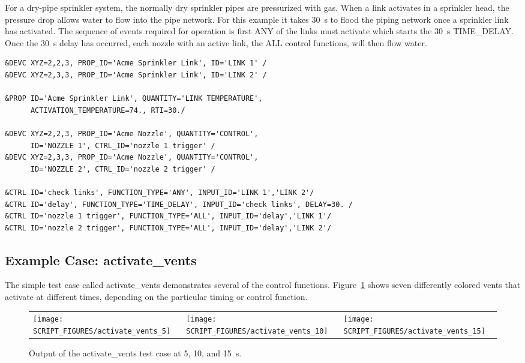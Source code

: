 \documentclass[11pt]{book}
\begin{document}
For a dry-pipe sprinkler system, the normally
dry sprinkler pipes are pressurized with gas.  When a link activates in a sprinkler head, the pressure drop allows
water to flow into the pipe network.  For this example it takes 30~s to flood the piping network once a sprinkler link
has activated.  The sequence of events required for operation is first {\ct ANY} of the links must activate which
starts the 30~s {\ct TIME\_DELAY}.  Once the 30~s delay has occurred, each nozzle with an active link, the {\ct ALL}
control functions, will then flow water.

\begin{lstlisting}
&DEVC XYZ=2,2,3, PROP_ID='Acme Sprinkler Link', ID='LINK 1' /
&DEVC XYZ=2,3,3, PROP_ID='Acme Sprinkler Link', ID='LINK 2' /

&PROP ID='Acme Sprinkler Link', QUANTITY='LINK TEMPERATURE',
      ACTIVATION_TEMPERATURE=74., RTI=30./

&DEVC XYZ=2,2,3, PROP_ID='Acme Nozzle', QUANTITY='CONTROL',
      ID='NOZZLE 1', CTRL_ID='nozzle 1 trigger' /
&DEVC XYZ=2,3,3, PROP_ID='Acme Nozzle', QUANTITY='CONTROL',
      ID='NOZZLE 2', CTRL_ID='nozzle 2 trigger' /

&CTRL ID='check links', FUNCTION_TYPE='ANY', INPUT_ID='LINK 1','LINK 2'/
&CTRL ID='delay', FUNCTION_TYPE='TIME_DELAY', INPUT_ID='check links', DELAY=30. /
&CTRL ID='nozzle 1 trigger', FUNCTION_TYPE='ALL', INPUT_ID='delay','LINK 1'/
&CTRL ID='nozzle 2 trigger', FUNCTION_TYPE='ALL', INPUT_ID='delay','LINK 2'/
\end{lstlisting}


\subsection{Example Case: activate\_vents}
\label{activate_vents}

The simple test case called {\ct activate\_vents} demonstrates several of the control functions. Figure~\ref{activate_vents_fig} shows seven differently colored vents that activate at different times, depending on the particular timing or control function.
\begin{figure}[ht]
\begin{tabular*}{\textwidth}{lll}
\texttt{[image: SCRIPT\_FIGURES/activate\_vents\_5]} &
\texttt{[image: SCRIPT\_FIGURES/activate\_vents\_10]} &
\texttt{[image: SCRIPT\_FIGURES/activate\_vents\_15]}
\end{tabular*}
\caption[Snapshots of the {\ct activate\_vents} test case]{Output of the {\ct activate\_vents} test case at 5, 10, and 15~s.}
\label{activate_vents_fig}
\end{figure}
\end{document}
